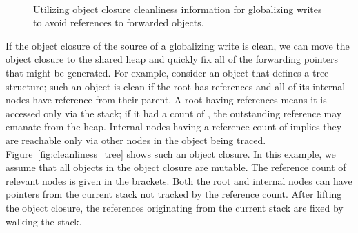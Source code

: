 \begin{figure}[t]
\centering
{}\\
\caption{Utilizing object closure cleanliness information for globalizing writes to avoid references to forwarded objects.}
\label{fig:cleanliness_examples}
\end{figure}

If the object closure of the source of a globalizing write is clean, we can move
the object closure to the shared heap and quickly fix all of the forwarding
pointers that might be generated. For example, consider an object that defines
a tree structure; such an object is clean if the root has  references
and all of its internal nodes have  reference from their parent.  A
root having  references means it is accessed only via the stack; if it
had a count of , the outstanding reference may emanate from the heap.
Internal nodes having a reference count of  implies they are reachable
only via other nodes in the object being traced.
Figure~\ref{fig:cleanliness_tree} shows such an object closure. In this
example, we assume that all objects in the object closure are mutable. The
reference count of relevant nodes is given in the brackets.  Both the root and
internal nodes can have pointers from the current stack not tracked by the
reference count. After lifting the object closure, the references originating
from the current stack are fixed by walking the stack.

